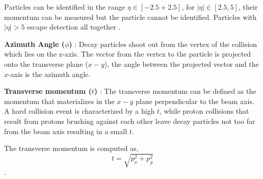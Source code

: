 \documentclass[final,3p,times,twocolumn]{elsarticle}
\begin{document}
Particles can be identified in the range $\eta \in [-2.5 +2.5]$, for $|\eta| \in [2.5,5]$, their momentum can be measured but the particle cannot be identified. Particles with $|\eta| > 5$ escape detection all together \cite{RM}. 

\textbf{Azimuth Angle ($\phi$)} : Decay particles shoot out from the vertex of the collision which lies on the z-axis. The vector from the vertex to the particle is projected onto the transverse plane ($x-y$), the angle between the projected vector and the $x$-axis is the azimuth angle. 

\textbf{Transverse momentum  ($t$)} : The transverse momentum can be defined as the momentum that materializes in the $x-y$ plane perpendicular to the beam axis. A hard collision event is characterized by a high $t$, while proton collisions that result from protons brushing against each other leave decay particles not too far from the beam axis resulting in a small $t$. 

The transverse momentum is computed as, $$ t = \sqrt{p_{x}^2 + p_{y}^2}$$.
\end{document}
